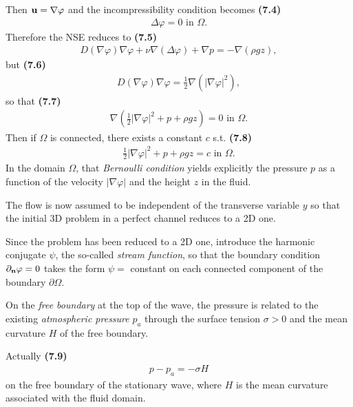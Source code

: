 \documentclass{book}
\numberwithin{equation}{section}
\begin{document}
\begin{enumerate}
    Then ${\bf u} = \nabla\varphi$ and the incompressibility condition becomes \textbf{(7.4)}
    \begin{align*}
        \Delta\varphi = 0 \mbox{ in } \Omega.
    \end{align*}
    Therefore the NSE reduces to \textbf{(7.5)}
    \begin{align*}
        D(\nabla\varphi)\nabla\varphi + \nu\nabla(\Delta\varphi) + \nabla p = -\nabla(\rho gz),
    \end{align*}
    but \textbf{(7.6)}
    \begin{align*}
        D(\nabla\varphi)\nabla\varphi = \frac{1}{2}\nabla(|\nabla\varphi|^2),
    \end{align*}
    so that \textbf{(7.7)}
    \begin{align*}
        \nabla\left(\frac{1}{2}|\nabla\varphi|^2 + p + \rho gz\right) = 0 \mbox{ in } \Omega.
    \end{align*}
    Then if $\Omega$ is connected, there exists a constant $c$ s.t. \textbf{(7.8)}
    \begin{align*}
        \frac{1}{2}|\nabla\varphi|^2 + p + \rho gz = c \mbox{ in } \Omega.
    \end{align*}
    In the domain $\Omega$, that \textit{Bernoulli condition} yields explicitly the pressure $p$ as a function of the velocity $|\nabla\varphi|$ and the height $z$ in the fluid.
    
    The flow is now assumed to be independent of the transverse variable $y$ so that the initial 3D problem in a perfect channel reduces to a 2D one.
    
    Since the problem has been reduced to a 2D one, introduce the harmonic conjugate $\psi$, the so-called \textit{stream function}, so that the boundary condition $\partial_{\bf n}\varphi = 0$ takes the form $\psi =$ constant on each connected component of the boundary $\partial\Omega$.
    
    On the \textit{free boundary} at the top of the wave, the pressure is related to the existing \textit{atmospheric pressure} $p_a$ through the surface tension $\sigma > 0$ and the mean curvature $H$ of the free boundary.
    
    Actually \textbf{(7.9)}
    \begin{align*}
        p - p_a = -\sigma H
    \end{align*}
    on the free boundary of the stationary wave, where $H$ is the mean curvature associated with the fluid domain.
    

\end{enumerate}
\end{document}
